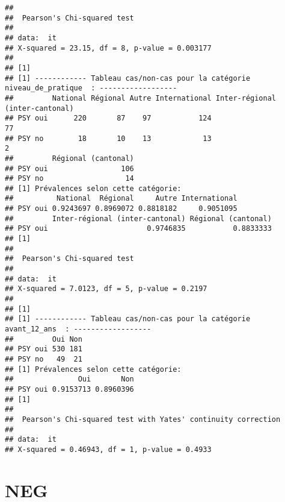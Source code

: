 \documentclass[
]{article}
\begin{document}
\begin{verbatim}
## 
##  Pearson's Chi-squared test
## 
## data:  it
## X-squared = 23.15, df = 8, p-value = 0.003177
## 
## [1] 
## [1] ------------ Tableau cas/non-cas pour la catégorie  niveau_de_pratique  : ------------------
##         National Régional Autre International Inter-régional (inter-cantonal)
## PSY oui      220       87    97           124                              77
## PSY no        18       10    13            13                               2
##         Régional (cantonal)
## PSY oui                 106
## PSY no                   14
## [1] Prévalences selon cette catégorie:
##          National  Régional     Autre International
## PSY oui 0.9243697 0.8969072 0.8818182     0.9051095
##         Inter-régional (inter-cantonal) Régional (cantonal)
## PSY oui                       0.9746835           0.8833333
## [1] 
## 
##  Pearson's Chi-squared test
## 
## data:  it
## X-squared = 7.0123, df = 5, p-value = 0.2197
## 
## [1] 
## [1] ------------ Tableau cas/non-cas pour la catégorie  avant_12_ans  : ------------------
##         Oui Non
## PSY oui 530 181
## PSY no   49  21
## [1] Prévalences selon cette catégorie:
##               Oui       Non
## PSY oui 0.9153713 0.8960396
## [1] 
## 
##  Pearson's Chi-squared test with Yates' continuity correction
## 
## data:  it
## X-squared = 0.46943, df = 1, p-value = 0.4933
\end{verbatim}

\hypertarget{neg}{%
\section{NEG}\label{neg}}
\end{document}
